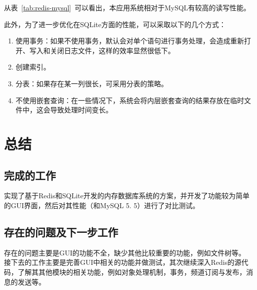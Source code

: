 \documentclass{zjutthesis}
\begin{document}
从表~\ref{tab:redis-mysql}~可以看出，本应用系统相对于MySQL有较高的读写性能。

此外，为了进一步优化在SQLite方面的性能，可以采取以下的几个方式：
\begin{enumerate}[label=\arabic*.]
\item{使用事务：如果不使用事务，默认会对单个语句进行事务处理，会造成重新打开、写入和关闭日志文件，这样的效率显然很低下。}
\item{创建索引。}
\item{分表：如果存在某一列很长，可采用分表的策略。}
\item{不使用嵌套查询：在一些情况下，系统会将内层嵌套查询的结果存放在临时文件中，这会导致处理时间变长。}
\end{enumerate}

\chapter{总结}
\section{完成的工作}
实现了基于Redis和SQLite开发的内存数据库系统的方案，并开发了功能较为简单的GUI界面，然后对其性能（和MySQL 5.
5）进行了对比测试。
\section{存在的问题及下一步工作}
存在的问题主要是GUI的功能不全，缺少其他比较重要的功能，例如文件树等。
接下去的工作主要是完善GUI中相关的功能并做测试，其次继续深入Redis的源代码，了解其其他模块的相关功能，例如对象处理机制，事务，频道订阅与发布，消息的发送等。

\backmatter


\nocite{*}                                   %


\appendix

\end{document}
